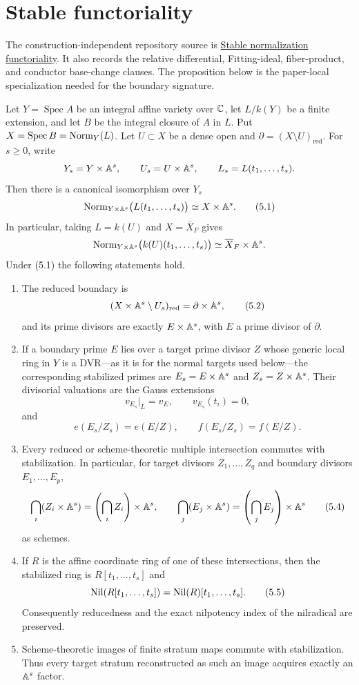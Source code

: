 \section{Stable functoriality}

The construction-independent repository source is
\href{../../verified/STABLE_NORMALIZATION_FUNCTORIALITY.md}
{Stable normalization functoriality}.  It also records the relative
differential, Fitting-ideal, fiber-product, and conductor base-change clauses.
The proposition below is the paper-local specialization needed for the
boundary signature.

\begin{proposition}
\label{prop:stable-normalization}
Let $Y=\operatorname{Spec}A$ be an integral affine variety over $\mathbb C$, let
$L/k(Y)$ be a finite extension, and let $B$ be the integral closure of $A$
in $L$.  Put $X=\operatorname{Spec}B=\operatorname{Norm}_Y(L)$.  Let $U\subset X$ be a
dense open and $\partial=(X\setminus U)_{\mathrm{red}}$.  For $s\ge0$, write
\[
 Y_s=Y\times\mathbb A^s,\qquad U_s=U\times\mathbb A^s,
 \qquad L_s=L(t_1,\ldots,t_s).
\]
Then there is a canonical isomorphism over $Y_s$
\[
 \operatorname{Norm}_{Y\times\mathbb A^s}\bigl(L(t_1,\ldots,t_s)\bigr)
 \simeq X\times\mathbb A^s.                                    \tag{5.1}
\]
In particular, taking $L=k(U)$ and $X=\overline X_F$ gives
\[
 \operatorname{Norm}_{Y\times\mathbb A^s}\bigl(k(U)(t_1,\ldots,t_s)\bigr)
 \simeq\overline X_F\times\mathbb A^s.
\]
Under (5.1) the following statements hold.
\begin{enumerate}
\item The reduced boundary is
\[
 (X\times\mathbb A^s\setminus U_s)_{\mathrm{red}}
 =\partial\times\mathbb A^s,                                   \tag{5.2}
\]
and its prime divisors are exactly $E\times\mathbb A^s$, with $E$ a
prime divisor of $\partial$.
\item If a boundary prime $E$ lies over a target prime divisor $Z$ whose
generic local ring in $Y$ is a DVR---as it is for the normal targets used
below---the corresponding stabilized primes are $E_s=E\times\mathbb A^s$ and
$Z_s=Z\times\mathbb A^s$.  Their divisorial valuations are the Gauss extensions
\[
 v_{E_s}|_L=v_E,\qquad v_{E_s}(t_i)=0,
\]
and
\[
 e(E_s/Z_s)=e(E/Z),\qquad f(E_s/Z_s)=f(E/Z).             \tag{5.3}
\]
\item Every reduced or scheme-theoretic multiple intersection commutes with
stabilization.  In particular, for target divisors $Z_1,\ldots,Z_q$ and
boundary divisors $E_1,\ldots,E_p$,
\[
 \bigcap_i(Z_i\times\mathbb A^s)
 =\left(\bigcap_i Z_i\right)\times\mathbb A^s,
 \qquad
 \bigcap_j(E_j\times\mathbb A^s)
 =\left(\bigcap_j E_j\right)\times\mathbb A^s                 \tag{5.4}
\]
as schemes.
\item If $R$ is the affine coordinate ring of one of these intersections,
then the stabilized ring is $R[t_1,\ldots,t_s]$ and
\[
 \operatorname{Nil}(R[t_1,\ldots,t_s])=\operatorname{Nil}(R)[t_1,\ldots,t_s].       \tag{5.5}
\]
Consequently reducedness and the exact nilpotency index of the nilradical
are preserved.
\item Scheme-theoretic images of finite stratum maps commute with
stabilization.  Thus every target stratum reconstructed as such an image
acquires exactly an $\mathbb A^s$ factor.
\end{enumerate}
\end{proposition}

